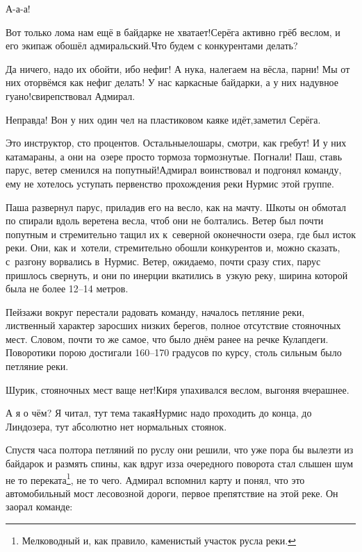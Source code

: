 \diagdash А-а-а!

\diagdash Вот только лома нам ещё в байдарке не хватает!\mdash Серёга активно грёб веслом, и его экипаж обошёл адмиральский.\mdash Что будем с конкурентами делать?

\diagdash Да ничего, надо их обойти, ибо нефиг! А ну\sdash ка, налегаем на вёсла, парни! Мы от них оторвёмся как нефиг делать! У нас каркасные байдарки, а у них надувное гуано!\mdash свирепствовал Адмирал.

\diagdash Неправда! Вон у них один чел на пластиковом каяке идёт,\mdash заметил Серёга.

\diagdash Это инструктор, сто процентов. Остальные\mdash лошары, смотри, как гребут! И у них катамараны, а они на~озере просто тормоза тормознутые. Погнали! Паш, ставь парус, ветер сменился на попутный!\mdash Адмирал воинствовал и подгонял команду, ему не хотелось уступать первенство прохождения реки Нурмис этой группе.

Паша развернул парус, приладив его на весло, как на мачту. Шкоты он обмотал по спирали вдоль веретена весла, чтоб они не болтались. Ветер был почти попутным и стремительно тащил их к~северной оконечности озера, где был исток реки. Они, как и~хотели, стремительно обошли конкурентов и, можно сказать, с~разгону ворвались в~Нурмис. Ветер, ожидаемо, почти сразу стих, парус пришлось свернуть, и они по инерции вкатились в~узкую реку, ширина которой была не более 12\nobreakdash--14 метров.

Пейзажи вокруг перестали радовать команду, началось петляние реки, лиственный характер заросших низких берегов, полное отсутствие стояночных мест. Словом, почти то же самое, что было днём ранее на речке Кулапдеги. Поворотики порою достигали 160\nobreakdash--170 градусов по курсу, столь сильным было петляние реки.

\diagdash Шурик, стояночных мест ваще нет!\mdash Киря упахивался веслом, выгоняя вчерашнее.

\diagdash А я о чём? Я читал, тут тема такая\mdash Нурмис надо проходить до конца, до Линдозера, тут абсолютно нет нормальных стоянок.

\renewcommand*{\thefootnote}{\fnsymbol{footnote}}
\setcounter{footnote}{0}
Спустя часа полтора петляний по руслу они решили, что уже пора бы вылезти из байдарок и размять спины, как вдруг из\sdash за очередного поворота стал слышен шум не то переката\footnote{Мелководный и, как правило, каменистый участок русла реки.}, не то чего. Адмирал вспомнил карту и понял, что это автомобильный мост лесовозной дороги, первое препятствие на этой реке. Он заорал команде:

